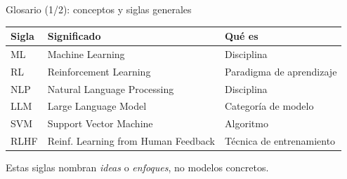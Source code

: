 \documentclass[aspectratio=169]{beamer}
\begin{document}
\begin{frame}{Glosario (1/2): conceptos y siglas generales}
  \small
  \begin{table}
    \begin{tabular}{lll}
      \toprule
      \textbf{Sigla} & \textbf{Significado} & \textbf{Qué es} \\
      \midrule
      ML   & Machine Learning                       & Disciplina \\
      RL   & Reinforcement Learning                 & Paradigma de aprendizaje \\
      NLP  & Natural Language Processing            & Disciplina \\
      LLM  & Large Language Model                   & Categoría de modelo \\
      SVM  & Support Vector Machine                 & Algoritmo \\
      RLHF & Reinf. Learning from Human Feedback    & Técnica de entrenamiento \\
      \bottomrule
    \end{tabular}
  \end{table}
  \bigskip
  Estas siglas nombran \textit{ideas} o \textit{enfoques}, no modelos concretos.
\end{frame}
\end{document}
